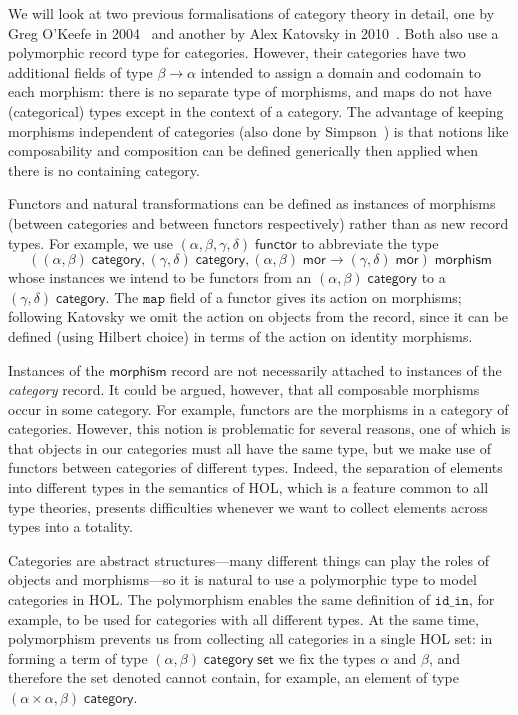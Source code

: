 \documentclass[twoside,titlepage,11pt]{article}
\begin{document}
We will look at two previous formalisations of category theory in detail, one by Greg O'Keefe in 2004~\cite{DBLP:journals/entcs/OKeefe04} and another by Alex Katovsky in 2010~\cite{Katovsky}.
Both also use a polymorphic record type for categories.
However, their categories have two additional fields of type $\beta\to\alpha$ intended to assign a domain and codomain to each morphism: there is no separate type of morphisms, and maps do not have (categorical) types except in the context of a category.
The advantage of keeping morphisms independent of categories (also done by Simpson~\cite{Simpson04}) is that notions like composability and composition can be defined generically then applied when there is no containing category.

Functors and natural transformations can be defined as instances of morphisms (between categories and between functors respectively) rather than as new record types.
For example, we use $(\alpha,\beta,\gamma,\delta)\;\mathsf{functor}$ to abbreviate the type \[((\alpha,\beta)\;\mathsf{category},(\gamma,\delta)\;\mathsf{category},(\alpha,\beta)\;\mathsf{mor}\to(\gamma,\delta)\;\mathsf{mor})\;\mathsf{morphism}\] whose instances we intend to be functors from an $(\alpha,\beta)\;\mathsf{category}$ to a $(\gamma,\delta)\;\mathsf{category}$.
The $\mathtt{map}$ field of a functor gives its action on morphisms; following Katovsky we omit the action on objects from the record, since it can be defined (using Hilbert choice) in terms of the action on identity morphisms.

Instances of the $\mathsf{morphism}$ record are not necessarily attached to instances of the \emph{category} record.
It could be argued, however, that all composable morphisms occur in some category.
For example, functors are the morphisms in a category of categories.
However, this notion is problematic for several reasons, one of which is that objects in our categories must all have the same type, but we make use of functors between categories of different types.
Indeed, the separation of elements into different types in the semantics of HOL, which is a feature common to all type theories, presents difficulties whenever we want to collect elements across types into a totality.

Categories are abstract structures---many different things can play the roles of objects and morphisms---so it is natural to use a polymorphic type to model categories in HOL.
The polymorphism enables the same definition of $\mathtt{id\_in}$, for example, to be used for categories with all different types.
At the same time, polymorphism prevents us from collecting all categories in a single HOL set: in forming a term of type $(\alpha,\beta)\;\mathsf{category}\;\mathsf{set}$ we fix the types $\alpha$ and $\beta$, and therefore the set denoted cannot contain, for example, an element of type $(\alpha\times\alpha,\beta)\;\mathsf{category}$.
\end{document}
